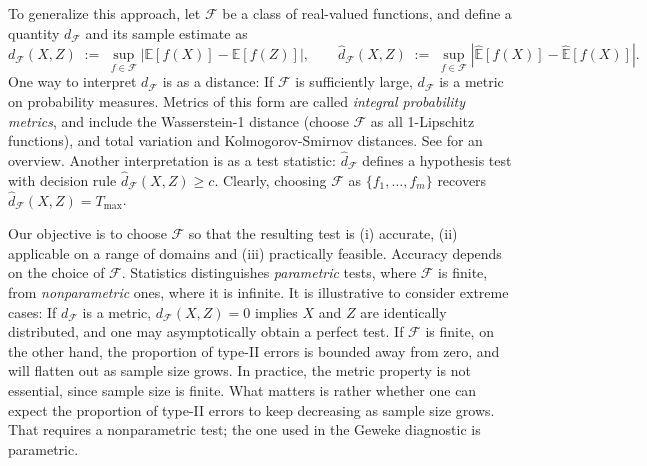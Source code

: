 \documentclass{article}
\begin{document}
To generalize this approach, let $\mathcal{F}$ be a
class of real-valued functions, and define a
quantity $d_\mathcal{F}$ and its sample estimate as
\begin{equation}
  d_{\mathcal{F}}(X,Z)\;:=\;\sup_{f\in\mathcal{F}}|\mathbb{E}[f(X)]-\mathbb{E}[f(Z)]|,\qquad
    \hat{d}_\mathcal{F}(X,Z)\;:=\;
    \sup_{f\in\mathcal{F}}|\hat{\mathbb{E}}[f(X)]-\hat{\mathbb{E}}[f(X)]|.
      \label{eq:naive-IPM}
\end{equation}
One way to interpret $d_\mathcal{F}$ is as a distance:
If $\mathcal{F}$ is sufficiently large, $d_\mathcal{F}$ is a
metric on probability measures. Metrics of this form are called
\emph{integral probability metrics}, and include the Wasserstein-1
distance (choose $\mathcal{F}$ as all 1-Lipschitz functions),
and total variation and Kolmogorov-Smirnov distances. See \cite{mueller:1997} for an overview.
Another interpretation is as a test statistic:
$\hat{d}_\mathcal{F}$ defines a hypothesis test with decision rule 
${\hat{d}_\mathcal{F}(X,Z)\geq c}$. Clearly, choosing
$\mathcal{F}$ as ${\{f_1,\ldots,f_m\}}$ recovers ${\hat{d}_\mathcal{F}(X,Z)=T_{\text{max}}}$.


Our objective is to choose $\mathcal{F}$ so that the resulting test is
(i) accurate, (ii) applicable on a range of
domains and (iii) practically feasible.
Accuracy depends on the choice of $\mathcal{F}$.
Statistics distinguishes \emph{parametric} tests, where $\mathcal{F}$ is
finite, from \emph{nonparametric} ones, where it is
infinite. It is illustrative to
consider extreme cases: If $d_\mathcal{F}$ is a metric,
${d_\mathcal{F}(X,Z)=0}$ implies $X$ and $Z$ are
identically distributed, and one may asymptotically obtain a perfect test.
If $\mathcal{F}$ is finite, on the other hand, the proportion of
type-II errors is bounded away from zero, and will flatten out as sample size
grows. 
In practice, the metric property is not essential, since sample size
is finite. What matters is rather whether one can expect the
proportion of type-II errors
to keep decreasing as sample size grows. That requires a nonparametric test;
the one used in the Geweke diagnostic is parametric.
\end{document}
